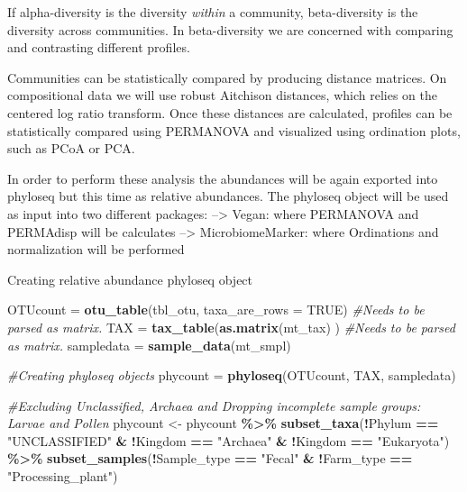 \documentclass[
]{article}
\newenvironment{Shaded}{\begin{snugshade}}{\end{snugshade}}
\newcommand{\AttributeTok}[1]{\textcolor[rgb]{0.13,0.29,0.53}{#1}}
\newcommand{\CommentTok}[1]{\textcolor[rgb]{0.56,0.35,0.01}{\textit{#1}}}
\newcommand{\ConstantTok}[1]{\textcolor[rgb]{0.56,0.35,0.01}{#1}}
\newcommand{\FunctionTok}[1]{\textcolor[rgb]{0.13,0.29,0.53}{\textbf{#1}}}
\newcommand{\NormalTok}[1]{#1}
\newcommand{\OtherTok}[1]{\textcolor[rgb]{0.56,0.35,0.01}{#1}}
\newcommand{\SpecialCharTok}[1]{\textcolor[rgb]{0.81,0.36,0.00}{\textbf{#1}}}
\newcommand{\StringTok}[1]{\textcolor[rgb]{0.31,0.60,0.02}{#1}}
\begin{document}
If alpha-diversity is the diversity \emph{within} a community,
beta-diversity is the diversity across communities. In beta-diversity we
are concerned with comparing and contrasting different profiles.

Communities can be statistically compared by producing distance
matrices. On compositional data we will use robust Aitchison distances,
which relies on the centered log ratio transform. Once these distances
are calculated, profiles can be statistically compared using PERMANOVA
and visualized using ordination plots, such as PCoA or PCA.

In order to perform these analysis the abundances will be again exported
into phyloseq but this time as relative abundances. The phyloseq object
will be used as input into two different packages: --\textgreater{}
Vegan: where PERMANOVA and PERMAdisp will be calculates --\textgreater{}
MicrobiomeMarker: where Ordinations and normalization will be performed

Creating relative abundance phyloseq object

\begin{Shaded}
\begin{Highlighting}[]
\NormalTok{OTUcount }\OtherTok{=} \FunctionTok{otu\_table}\NormalTok{(tbl\_otu, }
                \AttributeTok{taxa\_are\_rows =} \ConstantTok{TRUE}\NormalTok{)}
      \CommentTok{\#Needs to be parsed as matrix.}
\NormalTok{TAX }\OtherTok{=} \FunctionTok{tax\_table}\NormalTok{(}\FunctionTok{as.matrix}\NormalTok{(mt\_tax)}
\NormalTok{                )}
      \CommentTok{\#Needs to be parsed as matrix.}
\NormalTok{sampledata }\OtherTok{=} \FunctionTok{sample\_data}\NormalTok{(mt\_smpl)}

\CommentTok{\#Creating phyloseq objects}
\NormalTok{phycount }\OtherTok{=} \FunctionTok{phyloseq}\NormalTok{(OTUcount, TAX, sampledata)}


\CommentTok{\#Excluding Unclassified, Archaea and Dropping incomplete sample groups: Larvae and Pollen}
\NormalTok{phycount }\OtherTok{\textless{}{-}}\NormalTok{ phycount }\SpecialCharTok{\%\textgreater{}\%}
  \FunctionTok{subset\_taxa}\NormalTok{(}\SpecialCharTok{!}\NormalTok{Phylum }\SpecialCharTok{==} \StringTok{"UNCLASSIFIED"} \SpecialCharTok{\&} \SpecialCharTok{!}\NormalTok{Kingdom }\SpecialCharTok{==} \StringTok{"Archaea"} \SpecialCharTok{\&} \SpecialCharTok{!}\NormalTok{Kingdom }\SpecialCharTok{==} \StringTok{"Eukaryota"}\NormalTok{) }\SpecialCharTok{\%\textgreater{}\%}
  \FunctionTok{subset\_samples}\NormalTok{(}\SpecialCharTok{!}\NormalTok{Sample\_type }\SpecialCharTok{==} \StringTok{"Fecal"} \SpecialCharTok{\&} \SpecialCharTok{!}\NormalTok{Farm\_type }\SpecialCharTok{==} \StringTok{"Processing\_plant"}\NormalTok{)}
\end{Highlighting}
\end{Shaded}
\end{document}
